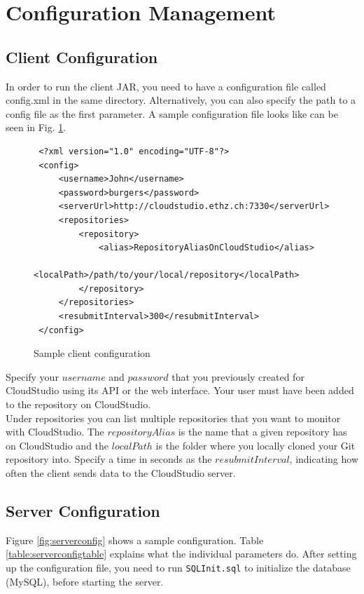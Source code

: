\section{Configuration Management}\label{configmanagement}

\subsection{Client Configuration}

In order to run the client JAR, you need to have a configuration file called config.xml in the same directory. Alternatively, you can also specify the path to a config file as the first parameter. A sample configuration file looks like can be seen in Fig. \ref{fig:clientconfig}. \\

\begin{figure}[h!]
\begin{lstlisting}
 <?xml version="1.0" encoding="UTF-8"?>
 <config>
     <username>John</username>
     <password>burgers</password>
     <serverUrl>http://cloudstudio.ethz.ch:7330</serverUrl>
     <repositories>
         <repository>
             <alias>RepositoryAliasOnCloudStudio</alias>
             <localPath>/path/to/your/local/repository</localPath>
         </repository>
     </repositories>
     <resubmitInterval>300</resubmitInterval>
 </config>
\end{lstlisting}
  \centering
  \caption{Sample client configuration}
  \label{fig:clientconfig}
\end{figure}


Specify your $username$ and $password$ that you previously created for CloudStudio using its API or the web interface. Your user must have been added to the repository on CloudStudio. \\

Under repositories you can list multiple repositories that you want to monitor with CloudStudio. The $repositoryAlias$ is the name that a given repository has on CloudStudio and the $localPath$ is the folder where you locally cloned your Git repository into. Specify a time in seconds as the $resubmitInterval$, indicating how often the client sends data to the CloudStudio server.


\subsection{Server Configuration}

Figure \ref{fig:serverconfig} shows a sample configuration. Table \ref{table:serverconfigtable} explains what the individual parameters do. After setting up the configuration file, you need to run \texttt{SQLInit.sql} to initialize the database (MySQL), before starting the server.

